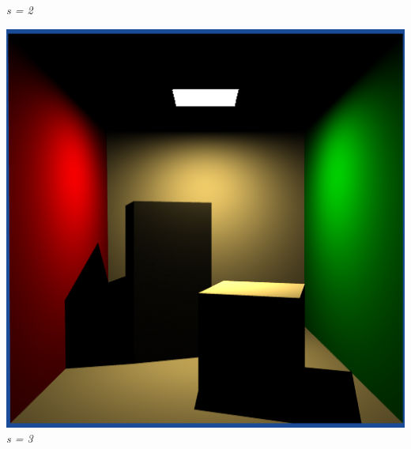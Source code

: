 \documentclass[a4,12pt]{article}
\begin{document}
\begin{center}
\begin{minipage}[b]{0.40\linewidth}
\begin{center}
				\textit{s = 2}
			\end{center}
		\end{minipage}
	\end{center}
	
	\begin{center}
		\begin{minipage}[b]{0.40\linewidth}
			\begin{center}
				\includegraphics[width = \textwidth]{./Worksheet6/cornellblocks3.png}\\
				\textit{s = 3}
			\end{center}
		\end{minipage}
		\hspace{0.05\linewidth}
		\begin{minipage}[b]{0.40\linewidth}
			\begin{center}

\end{center}
\end{minipage}
\end{center}
\end{document}
